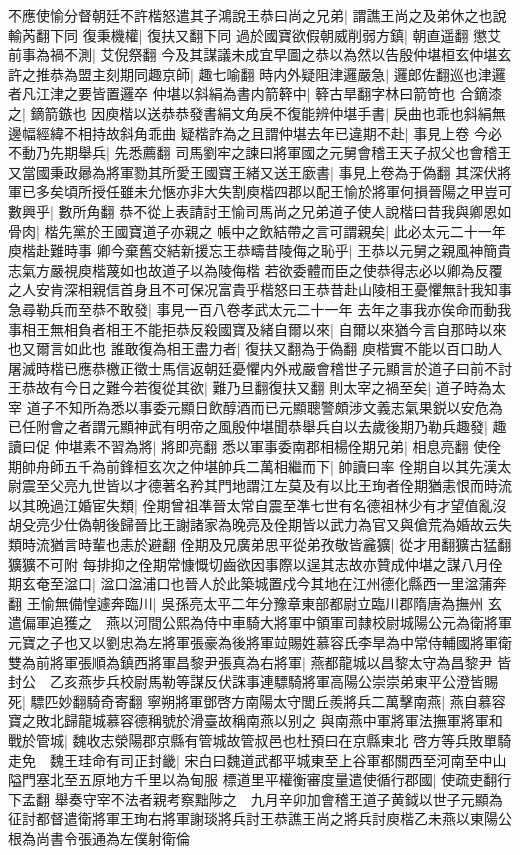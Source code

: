 不應使愉分督朝廷不許楷怒遣其子鴻說王恭曰尚之兄弟|{
	謂譙王尚之及弟休之也說輸芮翻下同}
復秉機權|{
	復扶又翻下同}
過於國寶欲假朝威削弱方鎮|{
	朝直遥翻}
懲艾前事為禍不測|{
	艾倪祭翻}
今及其謀議未成宜早圖之恭以為然以告殷仲堪桓玄仲堪玄許之推恭為盟主刻期同趣京師|{
	趣七喻翻}
時内外疑阻津邏嚴急|{
	邏郎佐翻巡也津邏者凡江津之要皆置邏卒}
仲堪以斜絹為書内箭簳中|{
	簳古旱翻字林曰箭笴也}
合鏑漆之|{
	鏑箭鏃也}
因庾楷以送恭恭發書絹文角戾不復能辨仲堪手書|{
	戾曲也乖也斜絹無邊幅經緯不相持故斜角乖曲}
疑楷詐為之且謂仲堪去年已違期不赴|{
	事見上卷}
今必不動乃先期舉兵|{
	先悉薦翻}
司馬劉牢之諫曰將軍國之元舅會稽王天子叔父也會稽王又當國秉政曏為將軍勠其所愛王國寶王緒又送王廞書|{
	事見上卷為于偽翻}
其深伏將軍已多矣頃所授任雖未允愜亦非大失割庾楷四郡以配王愉於將軍何損晉陽之甲豈可數興乎|{
	數所角翻}
恭不從上表請討王愉司馬尚之兄弟道子使人說楷曰昔我與卿恩如骨肉|{
	楷先黨於王國寶道子亦親之}
帳中之飲結帶之言可謂親矣|{
	此必太元二十一年庾楷赴難時事}
卿今棄舊交結新援忘王恭疇昔陵侮之恥乎|{
	王恭以元舅之親風神簡貴志氣方嚴視庾楷蔑如也故道子以為陵侮楷}
若欲委體而臣之使恭得志必以卿為反覆之人安肯深相親信首身且不可保况富貴乎楷怒曰王恭昔赴山陵相王憂懼無計我知事急尋勒兵而至恭不敢發|{
	事見一百八卷孝武太元二十一年}
去年之事我亦俟命而動我事相王無相負者相王不能拒恭反殺國寶及緒自爾以來|{
	自爾以來猶今言自那時以來也又爾言如此也}
誰敢復為相王盡力者|{
	復扶又翻為于偽翻}
庾楷實不能以百口助人屠滅時楷已應恭檄正徵士馬信返朝廷憂懼内外戒嚴會稽世子元顯言於道子曰前不討王恭故有今日之難今若復從其欲|{
	難乃旦翻復扶又翻}
則太宰之禍至矣|{
	道子時為太宰}
道子不知所為悉以事委元顯日飲醇酒而已元顯聰警頗涉文義志氣果鋭以安危為已任附會之者謂元顯神武有明帝之風殷仲堪聞恭舉兵自以去歲後期乃勒兵趣發|{
	趣讀曰促}
仲堪素不習為將|{
	將即亮翻}
悉以軍事委南郡相楊佺期兄弟|{
	相息亮翻}
使佺期帥舟師五千為前鋒桓玄次之仲堪帥兵二萬相繼而下|{
	帥讀曰率}
佺期自以其先漢太尉震至父亮九世皆以才德著名矜其門地謂江左莫及有以比王珣者佺期猶恚恨而時流以其晩過江婚宦失類|{
	佺期曾祖凖晉太常自震至凖七世有名德祖林少有才望值亂沒胡殳亮少仕偽朝後歸晉比王謝諸家為晚亮及佺期皆以武力為官又與傖荒為婚故云失類時流猶言時輩也恚於避翻}
佺期及兄廣弟思平從弟孜敬皆麄獷|{
	從才用翻獷古猛翻獷獷不可附}
每排抑之佺期常慷慨切齒欲因事際以逞其志故亦贊成仲堪之謀八月佺期玄奄至湓口|{
	湓口湓浦口也晉人於此築城置戍今其地在江州德化縣西一里湓蒲奔翻}
王愉無備惶遽奔臨川|{
	吳孫亮太平二年分豫章東部都尉立臨川郡隋唐為撫州}
玄遣偏軍追獲之　燕以河間公熙為侍中車騎大將軍中領軍司隸校尉城陽公元為衛將軍元寶之子也又以劉忠為左將軍張豪為後將軍竝賜姓慕容氏李旱為中常侍輔國將軍衛雙為前將軍張順為鎮西將軍昌黎尹張真為右將軍|{
	燕都龍城以昌黎太守為昌黎尹}
皆封公　乙亥燕步兵校尉馬勒等謀反伏誅事連驃騎將軍高陽公崇崇弟東平公澄皆賜死|{
	驃匹妙翻騎奇寄翻}
寧朔將軍鄧啓方南陽太守閭丘羨將兵二萬擊南燕|{
	燕自慕容寶之敗北歸龍城慕容德稱號於滑臺故稱南燕以别之}
與南燕中軍將軍法撫軍將軍和戰於管城|{
	魏收志滎陽郡京縣有管城故管叔邑也杜預曰在京縣東北}
啓方等兵敗單騎走免　魏王珪命有司正封畿|{
	宋白曰魏道武都平城東至上谷軍都關西至河南至中山隘門塞北至五原地方千里以為甸服}
標道里平權衡審度量遣使循行郡國|{
	使疏吏翻行下孟翻}
舉奏守宰不法者親考察黜陟之　九月辛卯加會稽王道子黄鉞以世子元顯為征討都督遣衛將軍王珣右將軍謝琰將兵討王恭譙王尚之將兵討庾楷乙未燕以東陽公根為尚書令張通為左僕射衛倫

